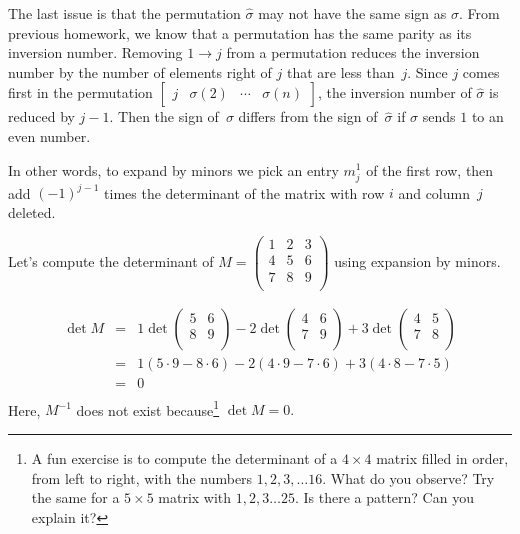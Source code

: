 The last issue is that the permutation $\hat{\sigma}$ may not have the same sign as $\sigma$.  From previous homework, we know that a permutation has the same parity as its inversion number.  Removing $1\rightarrow j$ from a permutation  reduces the inversion number by the number of elements right of $j$ that are less than~$j$.  Since $j$ comes first in the permutation $\begin{bmatrix}j & \sigma(2) & \cdots & \sigma(n) \end{bmatrix}$, the inversion number of $\hat{\sigma}$ is reduced by $j-1$.  Then the sign of~$\sigma$ differs from the sign of~$\hat{\sigma}$ if $\sigma$ sends $1$ to an even number.

In other words, to expand by minors we pick an entry $m^1_j$ of the first row, then add $(-1)^{j-1}$ times the determinant of the matrix with row $i$ and column~$j$ deleted.

\begin{example}
Let's compute the determinant of 
$M=\begin{pmatrix}
1 & 2 & 3 \\
4 & 5 & 6 \\
7 & 8 & 9 \\
\end{pmatrix}$ using expansion by minors.

\begin{eqnarray*}
\det M & = & 1\det \begin{pmatrix}
5 & 6 \\
8 & 9 \\
\end{pmatrix}
-2 \det \begin{pmatrix}
4 & 6 \\
7 & 9 \\
\end{pmatrix}
+3 \det \begin{pmatrix}
4 & 5 \\
7 & 8 \\
\end{pmatrix} \\
& = & 1(5\cdot 9- 8\cdot 6) -2 (4\cdot 9- 7\cdot 6) + 3 (4\cdot 8- 7\cdot 5) \\
& = & 0 \\
\end{eqnarray*}
Here, $M^{-1}$ does not exist because\footnote{A fun exercise is to compute the determinant of a $4\times 4$ matrix filled in order, from left to right,  with the numbers $1,2,3,\ldots 16$. What do you observe? Try the same for a $5\times 5$ matrix with $1,2,3\ldots 25$. Is there a pattern? Can you explain it?} $\det M=0.$
\end{example}


